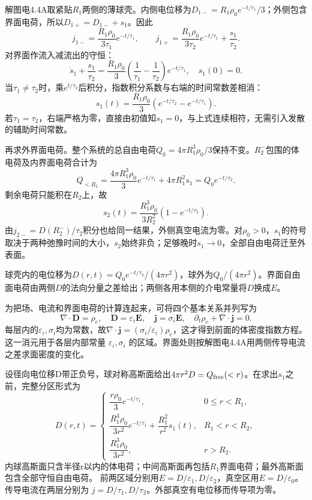 \documentclass[UTF8,fontset=fandol,a4paper,11pt]{ctexart}
\begin{document}
解图电4.4A取紧贴$R_1$两侧的薄球壳。内侧电位移为$D_{1-}=R_1\rho_0e^{-t/\tau_1}/3$；外侧包含界面电荷，所以$D_{1+}=D_{1-}+s_1$。因此
\[
j_{1-}=\frac{R_1\rho_0}{3\tau_1}e^{-t/\tau_1},\qquad
j_{1+}=\frac{R_1\rho_0}{3\tau_2}e^{-t/\tau_1}+\frac{s_1}{\tau_2}.
\]
对界面作流入减流出的守恒：
\[
\dot s_1+\frac{s_1}{\tau_2}
=\frac{R_1\rho_0}{3}\left(\frac1{\tau_1}-\frac1{\tau_2}\right)e^{-t/\tau_1},\quad s_1(0)=0.
\]
当$\tau_1\ne\tau_2$时，乘$e^{t/\tau_2}$后积分，指数积分系数与右端的时间常数差相消：
\[
\boxed{s_1(t)=\frac{R_1\rho_0}{3}(e^{-t/\tau_2}-e^{-t/\tau_1})}.
\]
若$\tau_1=\tau_2$，右端严格为零，直接由初值知$s_1=0$，与上式连续相符，无需引入发散的辅助时间常数。

再求外界面电荷。整个系统的总自由电荷$Q_0=4\pi R_1^3\rho_0/3$保持不变。$R_2^-$包围的体电荷及内界面电荷合计为
\[
Q_{<R_2}=\frac{4\pi R_1^3\rho_0}{3}e^{-t/\tau_1}+4\pi R_1^2s_1
=Q_0e^{-t/\tau_2}.
\]
剩余电荷只能积在$R_2$上，故
\[
\boxed{s_2(t)=\frac{R_1^3\rho_0}{3R_2^2}(1-e^{-t/\tau_2})}.
\]
由$j_{2-}=D(R_2^-)/\tau_2$积分也给同一结果，外侧真空电流为零。对$\rho_0>0$，$s_1$的符号取决于两种弛豫时间的大小，$s_2$始终非负；足够晚时$s_1\to0$，全部自由电荷迁至外表面。

球壳内的电位移为$D(r,t)=Q_0e^{-t/\tau_2}/(4\pi r^2)$，球外为$Q_0/(4\pi r^2)$。界面自由面电荷由两侧$D$的法向分量之差给出；两侧各用本侧的介电常量将$D$换成$E$。


为把场、电流和界面电荷的计算连起来，可将四个基本关系并列写为
\[
\nabla\cdot\boldsymbol D=\rho_e,\quad \boldsymbol D=\varepsilon_i\boldsymbol E,\quad
\boldsymbol j=\sigma_i\boldsymbol E,\quad \partial_t\rho_e+\nabla\cdot\boldsymbol j=0.
\]
每层内的$\varepsilon_i,\sigma_i$均为常数，故$\nabla\cdot\boldsymbol j=(\sigma_i/\varepsilon_i)\rho_e$，这才得到前面的体密度指数方程。
这一消元用于各层内部常量 $\varepsilon_i,\sigma_i$ 的区域。界面处则按解图电4.4A用两侧传导电流之差求面密度的变化。

设径向电位移D带正负号，球对称高斯面给出$4\pi r^2D=Q_{\rm free}(<r)$。在求出$s_1$之前，完整分区形式为
\[
D(r,t)=\begin{cases}
\dfrac{r\rho_0}{3}e^{-t/\tau_1},&0\le r<R_1,\\[4pt]
\dfrac{R_1^3\rho_0}{3r^2}e^{-t/\tau_1}+\dfrac{R_1^2}{r^2}s_1(t),&R_1<r<R_2,\\[4pt]
\dfrac{R_1^3\rho_0}{3r^2},&r>R_2.
\end{cases}
\]
内球高斯面只含半径r以内的体电荷；中间高斯面再包括$R_1$界面电荷；最外高斯面包含全部守恒自由电荷。
前两区域分别用$E=D/\varepsilon_1,D/\varepsilon_2$，真空区用$E=D/\varepsilon_0$。传导电流在两层分别为 $j=D/\tau_1,D/\tau_2$。外部真空有电位移而传导项为零。
\end{document}
